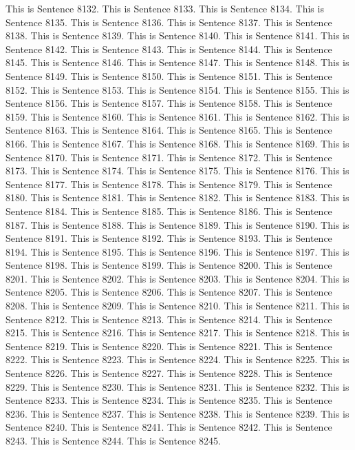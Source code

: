 \documentclass{article}
\begin{document}
This is Sentence 8132.
This is Sentence 8133.
This is Sentence 8134.
This is Sentence 8135.
This is Sentence 8136.
This is Sentence 8137.
This is Sentence 8138.
This is Sentence 8139.
This is Sentence 8140.
This is Sentence 8141.
This is Sentence 8142.
This is Sentence 8143.
This is Sentence 8144.
This is Sentence 8145.
This is Sentence 8146.
This is Sentence 8147.
This is Sentence 8148.
This is Sentence 8149.
This is Sentence 8150.
This is Sentence 8151.
This is Sentence 8152.
This is Sentence 8153.
This is Sentence 8154.
This is Sentence 8155.
This is Sentence 8156.
This is Sentence 8157.
This is Sentence 8158.
This is Sentence 8159.
This is Sentence 8160.
This is Sentence 8161.
This is Sentence 8162.
This is Sentence 8163.
This is Sentence 8164.
This is Sentence 8165.
This is Sentence 8166.
This is Sentence 8167.
This is Sentence 8168.
This is Sentence 8169.
This is Sentence 8170.
This is Sentence 8171.
This is Sentence 8172.
This is Sentence 8173.
This is Sentence 8174.
This is Sentence 8175.
This is Sentence 8176.
This is Sentence 8177.
This is Sentence 8178.
This is Sentence 8179.
This is Sentence 8180.
This is Sentence 8181.
This is Sentence 8182.
This is Sentence 8183.
This is Sentence 8184.
This is Sentence 8185.
This is Sentence 8186.
This is Sentence 8187.
This is Sentence 8188.
This is Sentence 8189.
This is Sentence 8190.
This is Sentence 8191.
This is Sentence 8192.
This is Sentence 8193.
This is Sentence 8194.
This is Sentence 8195.
This is Sentence 8196.
This is Sentence 8197.
This is Sentence 8198.
This is Sentence 8199.
This is Sentence 8200.
This is Sentence 8201.
This is Sentence 8202.
This is Sentence 8203.
This is Sentence 8204.
This is Sentence 8205.
This is Sentence 8206.
This is Sentence 8207.
This is Sentence 8208.
This is Sentence 8209.
This is Sentence 8210.
This is Sentence 8211.
This is Sentence 8212.
This is Sentence 8213.
This is Sentence 8214.
This is Sentence 8215.
This is Sentence 8216.
This is Sentence 8217.
This is Sentence 8218.
This is Sentence 8219.
This is Sentence 8220.
This is Sentence 8221.
This is Sentence 8222.
This is Sentence 8223.
This is Sentence 8224.
This is Sentence 8225.
This is Sentence 8226.
This is Sentence 8227.
This is Sentence 8228.
This is Sentence 8229.
This is Sentence 8230.
This is Sentence 8231.
This is Sentence 8232.
This is Sentence 8233.
This is Sentence 8234.
This is Sentence 8235.
This is Sentence 8236.
This is Sentence 8237.
This is Sentence 8238.
This is Sentence 8239.
This is Sentence 8240.
This is Sentence 8241.
This is Sentence 8242.
This is Sentence 8243.
This is Sentence 8244.
This is Sentence 8245.
\end{document}
